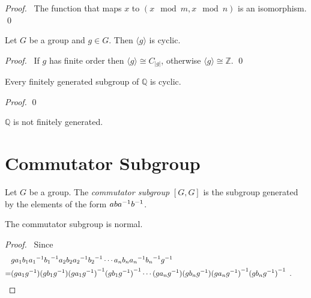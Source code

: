 \begin{proof}
    \pf\ The function that maps $x$ to $(x \mod m, x \mod n)$ is an isomorphism. \qed
\end{proof}

\begin{prop}
Let $G$ be a group and $g \in G$. Then $\langle g \rangle$ is cyclic.
\end{prop}

\begin{proof}
\pf\ If $g$ has finite order then $\langle g \rangle \cong C_{|g|}$, otherwise $\langle g \rangle \cong \mathbb{Z}$. \qed
\end{proof}

\begin{prop}
Every finitely generated subgroup of $\mathbb{Q}$ is cyclic.
\end{prop}

\begin{proof}
\pf
{}
\qed
\end{proof}

\begin{cor}
$\mathbb{Q}$ is not finitely generated.
\end{cor}

\section{Commutator Subgroup}

\begin{df}
Let $G$ be a group. The \emph{commutator subgroup} $[G,G]$ is the subgroup generated by the elements of the form $ab{a}^{-1}{b}^{-1}$.
\end{df}

\begin{prop}
The commutator subgroup is normal.
\end{prop}

\begin{proof}
\pf\ Since
\begin{align*} 
& g a_1 b_1 {a_1}^{-1} {b_1}^{-1} a_2 b_2 {a_2}^{-1} {b_2}^{-1} \cdots a_n b_n {a_n}^{-1} {b_n}^{-1} {g}^{-1} \\
= & (g a_1 {g}^{-1}) (g b_1 {g}^{-1}) {(g a_1 {g}^{-1})}^{-1} {(g b_1 {g}^{-1})}^{-1} \cdots (g a_n {g}^{-1}) (g b_n {g}^{-1}) {(g a_n {g}^{-1})}^{-1} {(g b_n {g}^{-1})}^{-1} \enspace . \qquad \relax
\end{align*}
\end{proof}

